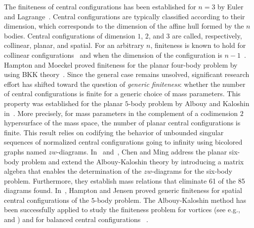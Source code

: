 \documentclass{amsart}
\theoremstyle{definition}
\theoremstyle{remark}
\numberwithin{equation}{section}
\begin{document}
The finiteness of central configurations has been established for $n=3$ by Euler~\cite{euler1767motu} and Lagrange~\cite{lagrange1772essai}. Central configurations are typically classified according to their dimension, which corresponds to the dimension of the affine hull formed by the $n$ bodies. Central configurations of dimension $1$, $2$, and $3$ are called, respectively, collinear, planar, and spatial. For an arbitrary $n$, finiteness is known to hold for collinear configurations~\cite{moulton1910straight} and when the dimension of the configuration is $n-1$~\cite{saari1980role}. Hampton and Moeckel proved finiteness for the planar four-body problem by using BKK theory~\cite{hampton2006finiteness}. Since the general case remains unsolved, significant research effort has shifted toward the question of \emph{generic finiteness}: whether the number of central configurations is finite for a generic choice of mass parameters. This property was established for the planar $5$-body problem by Albouy and Kaloshin in~\cite{albouy2012finiteness}. More precisely, for mass parameters in the complement of a codimension $2$ hypersurface of the mass space, the number of planar central configurations is finite. This result relies on codifying the behavior of unbounded singular sequences of normalized central configurations going to infinity using bicolored graphs named $zw$-diagrams. In~\cite{chang2024toward} and~\cite{chang2025toward}, Chen and Ming address the planar six-body problem and extend the Albouy-Kaloshin theory by introducing a matrix algebra that enables the determination of the $zw$-diagrams for the six-body problem. Furthermore, they establish mass relations that eliminate 61 of the 85 diagrams found. In~\cite{hampton2011finiteness}, Hampton and Jensen proved generic finiteness for spatial central configurations of the $5$-body problem. The Albouy-Kaloshin method has been successfully applied to study the finiteness problem for vortices (see e.g., \cite{yu2023finiteness} and \cite{yu2025finiteness}) and for balanced central configurations ~\cite{wang2024finiteness}.
\end{document}
